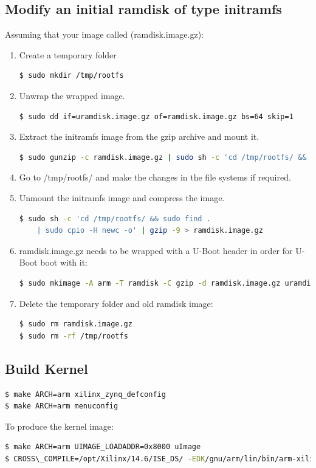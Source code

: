 \subsection{Modify an initial ramdisk of type initramfs}

Assuming that your image called (ramdisk.image.gz):
\begin{enumerate}
\item Create a temporary folder
\begin{lstlisting}[language=bash]
$ sudo mkdir /tmp/rootfs 
\end{lstlisting}
\item Unwrap the wrapped image.
\begin{lstlisting}[language=bash]
$ sudo dd if=uramdisk.image.gz of=ramdisk.image.gz bs=64 skip=1 
\end{lstlisting}
\item Extract the initramfs image from the gzip archive and mount it.
\begin{lstlisting}[language=bash]
$ sudo gunzip -c ramdisk.image.gz | sudo sh -c 'cd /tmp/rootfs/ && cpio -i' 
\end{lstlisting}
\item Go to /tmp/rootfs/ and make the changes in the file systems if required.
\item Unmount the initramfs image and compress the image.
\begin{lstlisting}[language=bash]
$ sudo sh -c 'cd /tmp/rootfs/ && sudo find . 
    | sudo cpio -H newc -o' | gzip -9 > ramdisk.image.gz 
\end{lstlisting}
\item ramdisk.image.gz needs to be wrapped with a U-Boot header in order for U-Boot boot with it:
\begin{lstlisting}[language=bash]
$ sudo mkimage -A arm -T ramdisk -C gzip -d ramdisk.image.gz uramdisk.image.gz 
\end{lstlisting}
\item Delete the temporary folder and old ramdisk image:
\begin{lstlisting}[language=bash]
$ sudo rm ramdisk.image.gz 
$ sudo rm -rf /tmp/rootfs 
\end{lstlisting}
\end{enumerate}
\subsection{Build Kernel}
\label{Build_Kernel}

\begin{lstlisting}[language=bash]
$ make ARCH=arm xilinx_zynq_defconfig 
$ make ARCH=arm menuconfig 
\end{lstlisting}
To produce the kernel image:
\begin{lstlisting}[language=bash]
$ make ARCH=arm UIMAGE_LOADADDR=0x8000 uImage 
$ CROSS\_COMPILE=/opt/Xilinx/14.6/ISE_DS/ -EDK/gnu/arm/lin/bin/arm-xilinx-linux-gnueabi
\end{lstlisting}
